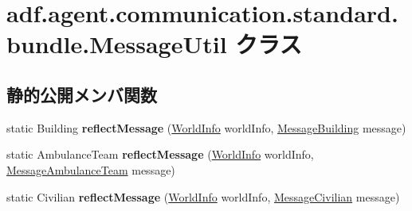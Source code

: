 \hypertarget{classadf_1_1agent_1_1communication_1_1standard_1_1bundle_1_1MessageUtil}{}\section{adf.\+agent.\+communication.\+standard.\+bundle.\+Message\+Util クラス}
\label{classadf_1_1agent_1_1communication_1_1standard_1_1bundle_1_1MessageUtil}
\subsection*{静的公開メンバ関数}
\begin{DoxyCompactItemize}
\item 
\hypertarget{classadf_1_1agent_1_1communication_1_1standard_1_1bundle_1_1MessageUtil_a94909277987408d9742f77968f8f3cc7}{}\label{classadf_1_1agent_1_1communication_1_1standard_1_1bundle_1_1MessageUtil_a94909277987408d9742f77968f8f3cc7} 
static Building {\bfseries reflect\+Message} (\hyperlink{classadf_1_1agent_1_1info_1_1WorldInfo}{World\+Info} world\+Info, \hyperlink{classadf_1_1agent_1_1communication_1_1standard_1_1bundle_1_1information_1_1MessageBuilding}{Message\+Building} message)
\item 
\hypertarget{classadf_1_1agent_1_1communication_1_1standard_1_1bundle_1_1MessageUtil_ae68421169dd87266308d9a4c43173e41}{}\label{classadf_1_1agent_1_1communication_1_1standard_1_1bundle_1_1MessageUtil_ae68421169dd87266308d9a4c43173e41} 
static Ambulance\+Team {\bfseries reflect\+Message} (\hyperlink{classadf_1_1agent_1_1info_1_1WorldInfo}{World\+Info} world\+Info, \hyperlink{classadf_1_1agent_1_1communication_1_1standard_1_1bundle_1_1information_1_1MessageAmbulanceTeam}{Message\+Ambulance\+Team} message)
\item 
\hypertarget{classadf_1_1agent_1_1communication_1_1standard_1_1bundle_1_1MessageUtil_ac0cd71fb9606b50618c97180b278bcfc}{}\label{classadf_1_1agent_1_1communication_1_1standard_1_1bundle_1_1MessageUtil_ac0cd71fb9606b50618c97180b278bcfc} 
static Civilian {\bfseries reflect\+Message} (\hyperlink{classadf_1_1agent_1_1info_1_1WorldInfo}{World\+Info} world\+Info, \hyperlink{classadf_1_1agent_1_1communication_1_1standard_1_1bundle_1_1information_1_1MessageCivilian}{Message\+Civilian} message)
\item 
\hypertarget{classadf_1_1agent_1_1communication_1_1standard_1_1bundle_1_1MessageUtil_a73c97068f0ecbe0f7ca1b5e4e96a9b52}{}\label{classadf_1_1agent_1_1communication_1_1standard_1_1bundle_1_1MessageUtil_a73c97068f0ecbe0f7ca1b5e4e96a9b52} 

\end{DoxyCompactItemize}
